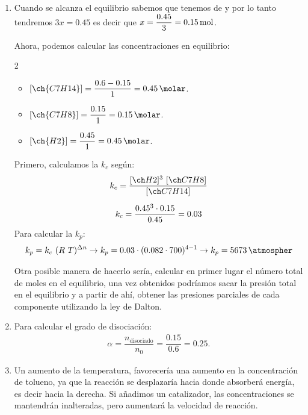 \begin{exerciseEVAU}
\begin{solu}
        \begin{enumerate}[label=\letraminuscula]
\item Cuando se alcanza el equilibrio sabemos que tenemos  de  y por lo tanto tendremos \(3x=0.45\) es decir que \(x=\dfrac{0.45}{3} = \SI{0.15}{\mole}\).

Ahora, podemos calcular las concentraciones en equilibrio:

\begin{multicols}{2}
    \begin{itemize}
        \item \([\ch{C7H14}] = \dfrac{0.6-0.15}{1} = \SI{0.45}{\molar}\).
        \item \([\ch{C7H8}] = \dfrac{0.15}{1} = \SI{0.15}{\molar}\).
        \item \([\ch{H2}] = \dfrac{0.45}{1} = \SI{0.45}{\molar}\).
    \end{itemize}
\end{multicols}
Primero, calculamos la \(k_c\) según:
\begin{gather*}
    k_c = \dfrac{\conc{H2}^3\ \conc{C7H8}}{\conc{C7H14}}\separ
    k_c = \dfrac{0.45^3 \cdot 0.15}{0.45} = 0.03
\end{gather*}
Para calcular la \(k_p\):
\begin{gather*}
    k_p = k_c\ (R\ T)^{\Delta n} \rightarrow k_p = 0.03\cdot (0.082\cdot 700)^{4-1} \rightarrow k_p = \SI{5673}{\atmospher}
\end{gather*}

Otra posible manera de hacerlo sería, calcular en primer lugar el número total de moles en el equilibrio, una vez obtenidos podríamos sacar la presión total en el equilibrio y a partir de ahí, obtener las presiones parciales de cada componente utilizando la ley de Dalton.

\item Para calcular el grado de disociación:
\begin{gather*}
    \alpha = \dfrac{n_{\text{disociado}}}{n_0} = \dfrac{0.15}{0.6} = 0.25.
\end{gather*}
\item Un aumento de la temperatura, favorecería una aumento en la concentración de tolueno, ya que la reacción se desplazaría hacia donde absorberá energía, es decir hacia la derecha.
Si añadimos un catalizador, las concentraciones se mantendrán inalteradas, pero aumentará la velocidad de reacción.
        \end{enumerate}

    \end{solu}


\end{exerciseEVAU}

